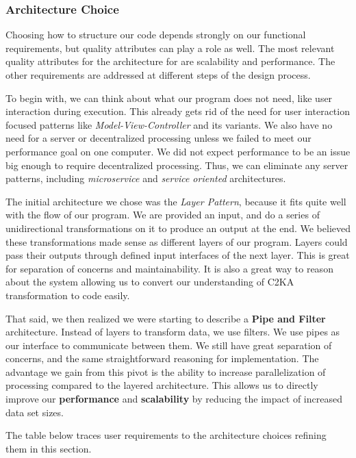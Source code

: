 \newpage
\subsubsection{Architecture Choice}
Choosing how to structure our code depends strongly on our functional requirements,
but quality attributes can play a role as well.
The most relevant quality attributes for the architecture for are scalability and performance.
The other requirements are addressed at different steps of the design process.

To begin with, we can think about what our program does not need, like user interaction during execution.
This already gets rid of the need for user interaction focused patterns like \textit{Model-View-Controller} and its variants.
We also have no need for a server or decentralized processing unless we failed to meet our performance goal on one computer.
We did not expect performance to be an issue big enough to require decentralized processing.
Thus, we can eliminate any server patterns, including \textit{microservice} and \textit{service oriented} architectures.

The initial architecture we chose was the \textit{Layer Pattern}, because it fits quite well with the flow of our program.
We are provided an input, and do a series of unidirectional transformations on it to produce an output at the end.
We believed these transformations made sense as different layers of our program.
Layers could pass their outputs through defined input interfaces of the next layer.
This is great for separation of concerns and maintainability.
It is also a great way to reason about the system allowing us to convert our understanding of C2KA transformation to code easily.

That said, we then realized we were starting to describe a \textbf{Pipe and Filter} architecture.
Instead of layers to transform data, we use filters.
We use pipes as our interface to communicate between them.
We still have great separation of concerns, and the same straightforward reasoning for implementation.
The advantage we gain from this pivot is the ability to increase parallelization of processing compared to the layered architecture.
This allows us to directly improve our \textbf{performance} and \textbf{scalability} by reducing the impact of increased data set sizes.

The table below traces user requirements to the architecture choices refining them in this section.

